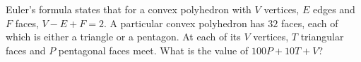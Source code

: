 Euler's formula states that for a convex polyhedron with $V$ vertices, $E$ edges and $F$ faces, $V-E+F=2$. A particular convex polyhedron has $32$ faces, each of which is either a triangle or a pentagon. At each of its $V$ vertices, $T$ triangular faces and $P$ pentagonal faces meet. What is the value of $100P+10T+V$?
